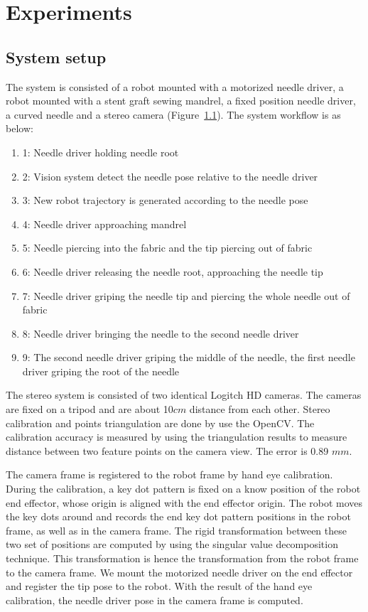 \section{Experiments}

\subsection{System setup}
The system is consisted of a robot mounted with a motorized needle driver, a robot mounted with a stent graft sewing mandrel, a fixed position needle driver, a curved needle and a stereo camera (Figure~\ref{}). The system workflow is as below:

\begin{enumerate}
\item{1}: Needle driver holding needle root
\item{2}: Vision system detect the needle pose relative to the needle driver
\item{3}: New robot trajectory is generated according to the needle pose
\item{4}: Needle driver approaching mandrel 
\item{5}: Needle piercing into the fabric and the tip piercing out of fabric
\item{6}: Needle driver releasing the needle root, approaching the needle tip
\item{7}: Needle driver griping the needle tip and piercing the whole needle out of fabric
\item{8}: Needle driver bringing the needle to the second needle driver
\item{9}: The second needle driver griping the middle of the needle, the first needle driver griping the root of the needle
\end{enumerate}

The stereo system is consisted of two identical Logitch HD cameras. The cameras are fixed on a tripod and are about 10$cm$ distance from each other. Stereo calibration and points triangulation are done by use the OpenCV. The calibration accuracy is measured by using the triangulation results to measure distance between two feature points on the camera view. The error is 0.89 $mm$.

The camera frame is registered to the robot frame by hand eye calibration. During the calibration, a key dot pattern is fixed on a know position of the robot end effector, whose origin is aligned with the end effector origin. The robot moves the key dots around and records the end key dot pattern positions in the robot frame, as well as in the camera frame. The rigid transformation between these two set of positions are computed by using the singular value decomposition technique. This transformation is hence the transformation from the robot frame to the camera frame. We mount the motorized needle driver on the end effector and register the tip pose to the robot. With the result of the hand eye calibration, the needle driver pose in the camera frame is computed.


